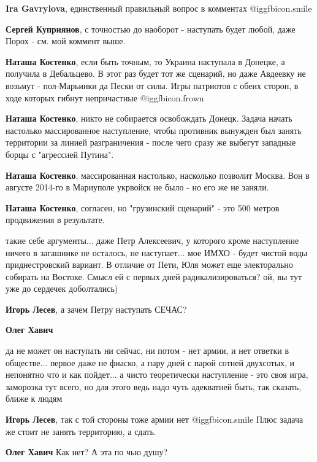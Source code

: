 \begin{itemize}
\begin{itemize}
\textbf{Ira Gavrylova}, единственный правильный вопрос в комментах  @igg{fbicon.smile} 

\textbf{Сергей Куприянов}, с точностью до наоборот - наступать будет любой, даже Порох - см. мой коммент выше.

\textbf{Наташа Костенко}, если быть точным, то Украина наступала в Донецке, а получила в Дебальцево. В этот раз будет тот же сценарий, но даже Авдеевку не возьмут - пол-Марьинки да Пески от силы. Игры патриотов с обеих сторон, в ходе которых гибнут непричастные  @igg{fbicon.frown} 

\textbf{Наташа Костенко}, никто не собирается освобождать Донецк. Задача начать настолько массированное наступление, чтобы противник вынужден был занять территории за линией разграничения - после чего сразу же выбегут западные борцы с "агрессией Путина".

\textbf{Наташа Костенко}, массированная настолько, насколько позволит Москва. Вон в августе 2014-го в Мариуполе укрвойск не было - но его же не заняли.

\textbf{Наташа Костенко}, согласен, но "грузинский сценарий" - это 500 метров продвижения в результате.


такие себе аргументы... даже Петр Алексеевич, у которого кроме наступление
ничего в загашнике не осталось, не наступает... мое ИМХО - будет чистой воды
приднестровский вариант. В отличие от Пети, Юля может еще электорально собирать
на Востоке. Смысл ей с первых дней радикализироваться? ой, вы тут уже до
сердечек доболтались)

\textbf{Игорь Лесев}, а зачем Петру наступать СЕЧАС?

\textbf{Олег Хавич} 

да не может он наступать ни сейчас, ни потом - нет армии, и нет ответки в
обществе... первое даже не фиаско, а пару дней с парой сотней двухсотых, и
непонятно что и как пойдет... а чисто теоретически наступление - это своя игра,
заморозка тут всего, но для этого ведь надо чуть адекватней быть, так сказать,
ближе к людям

\textbf{Игорь Лесев}, так с той стороны тоже армии нет  @igg{fbicon.smile}  Плюс задача же стоит не занять территорию, а сдать.

\textbf{Олег Хавич} Как нет? А эта по чью душу?


\end{itemize}
\end{itemize}
